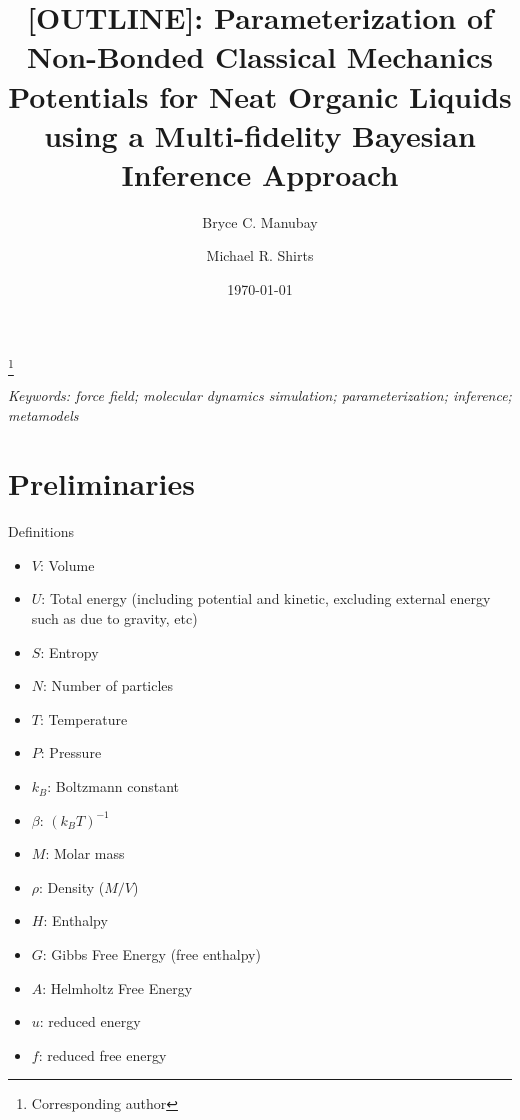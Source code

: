 \documentclass[aps,pre,nofootinbib,superscriptaddress,linenumbers,10pt, draft,tightenlines]{revtex4-1}
\begin{document}

\title{[OUTLINE]: Parameterization of Non-Bonded Classical Mechanics Potentials for Neat Organic Liquids using a Multi-fidelity Bayesian Inference Approach}

\author{Bryce C. Manubay} 

\author{Michael R. Shirts}
\thanks{Corresponding author}

\date{\today}



\emph{Keywords: force field; molecular dynamics simulation; parameterization; inference; metamodels}

\maketitle



\section{Preliminaries}
Definitions
\begin{itemize}
\item $V$: Volume
\item $U$: Total energy (including potential and kinetic, excluding external energy such as due to gravity, etc)
\item $S$: Entropy
\item $N$: Number of particles
\item $T$: Temperature
\item $P$: Pressure
\item $k_B$: Boltzmann constant
\item $\beta$: $(k_B T)^{-1}$
\item $M$: Molar mass
\item $\rho$: Density ($M/V$)
\item $H$: Enthalpy 
\item $G$: Gibbs Free Energy (free enthalpy)
\item $A$: Helmholtz Free Energy
\item $u$: reduced energy
\item $f$: reduced free energy
\end{itemize}
\pagebreak
\end{document}
